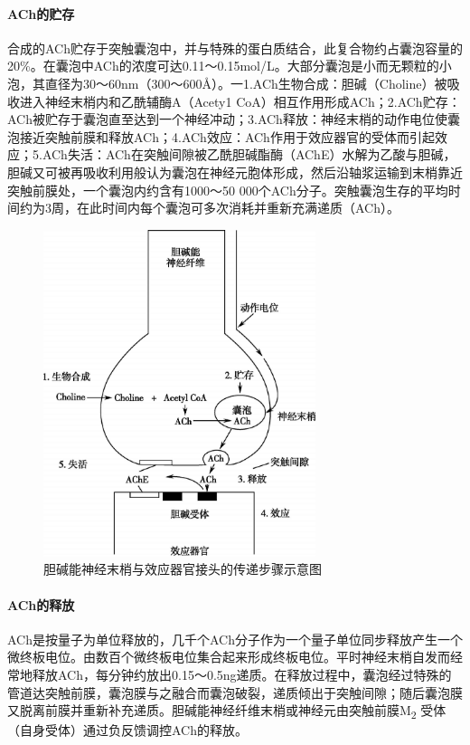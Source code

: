 \paragraph{ACh的贮存}

合成的ACh贮存于突触囊泡中，并与特殊的蛋白质结合，此复合物约占囊泡容量的20\%。在囊泡中ACh的浓度可达0.11～0.15mol/L。大部分囊泡是小而无颗粒的小泡，其直径为30～60nm（300～600Å）。一1.ACh生物合成：胆碱（Choline）被吸收进入神经末梢内和乙酰辅酶A（Acety1
CoA）相互作用形成ACh；2.ACh贮存：ACh被贮存于囊泡直至达到一个神经冲动；3.ACh释放：神经末梢的动作电位使囊泡接近突触前膜和释放ACh；4.ACh效应：ACh作用于效应器官的受体而引起效应；5.ACh失活：ACh在突触间隙被乙酰胆碱酯酶（AChE）水解为乙酸与胆碱，胆碱又可被再吸收利用般认为囊泡在神经元胞体形成，然后沿轴浆运输到末梢靠近突触前膜处，一个囊泡内约含有1000～50
000个ACh分子。突触囊泡生存的平均时间约为3周，在此时间内每个囊泡可多次消耗并重新充满递质（ACh）。

\begin{figure}[!htbp]
 \centering
 \includegraphics[width=3.13542in,height=3.76042in]{./images/Image00199.jpg}
 \captionsetup{justification=centering}
 \caption{胆碱能神经末梢与效应器官接头的传递步骤示意图}
 \label{fig55-2}
  \end{figure} 

\paragraph{ACh的释放}

ACh是按量子为单位释放的，几千个ACh分子作为一个量子单位同步释放产生一个微终板电位。由数百个微终板电位集合起来形成终板电位。平时神经末梢自发而经常地释放ACh，每分钟约放出0.15～0.5ng递质。在释放过程中，囊泡经过特殊的管道达突触前膜，囊泡膜与之融合而囊泡破裂，递质倾出于突触间隙；随后囊泡膜又脱离前膜并重新补充递质。胆碱能神经纤维末梢或神经元由突触前膜M\textsubscript{2}
受体（自身受体）通过负反馈调控ACh的释放。

